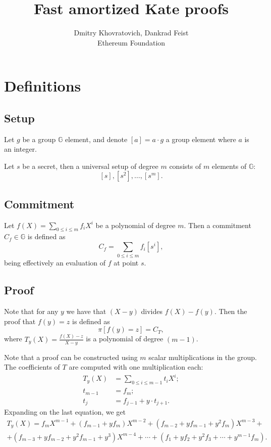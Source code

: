 \documentclass[a4paper]{article}
\title{Fast amortized Kate proofs}
\author{Dmitry Khovratovich, Dankrad Feist\\Ethereum Foundation}
\begin{document}
\maketitle

\section{Definitions}

\subsection{Setup}

Let $g$ be a group $\mathbb{G}$ element, and denote $[a] = a\cdot g$ a group element where $a$ is an integer. 

Let $s$ be a secret, then a universal setup of degree $m$ consists of  $m$ elements of $\mathbb{G}$:
$$
[s], [s^2], \ldots, [s^m].
$$


\subsection{Commitment}
Let $f(X) = \sum_{0\leq i \leq m}f_i X^i$ be a polynomial of degree $m$. Then a commitment $C_f\in \mathbb{G}$ is defined as
$$
C_f = \sum_{0\leq i \leq m} f_i[s^i],
$$
being effectively an evaluation of $f$ at point $s$.

\subsection{Proof}
Note that for any $y$ we have that $(X-y)$ divides $f(X) - f(y)$. Then the proof that $f(y) = z$ is defined as
$$
\pi[f(y)=z] = C_T,
$$
where $T_y(X) = \frac{f(X)-z}{X-y}$ is a polynomial of degree $(m-1)$.

Note that a proof can be constructed using $m$ scalar multiplications in the group. The coefficients of $T$ are computed with one multiplication each:
\begin{align}
    T_y(X) &= \sum_{0\leq i \leq m-1}t_i X^i;\\
    t_{m-1} &= f_m;\\
    t_j &= f_{j-1}+y\cdot t_{j+1} .
\end{align}
Expanding on the last equation, we get
\begin{multline}
T_y(X) =f_mX^{m-1} + (f_{m-1}+yf_{m})X^{m-2} + (f_{m-2}+yf_{m-1}+y^2f_m)X^{m-3} +\\+
(f_{m-3}+yf_{m-2}+y^2f_{m-1}+y^3)X^{m-4}+\cdots +  (f_{1}+yf_{2}+y^2f_3+\cdots+y^{m-1}f_m).
\end{multline}
\end{document}
